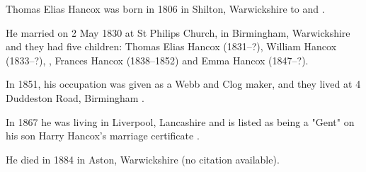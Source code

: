 
Thomas Elias Hancox was born in 1806 in Shilton, Warwickshire \cite{TEHancoxBirth} to  and .

He married  on 2  May 1830 at St Philips Church, in Birmingham, Warwickshire and they had five children: Thomas Elias Hancox (1831--?), William Hancox (1833--?), , Frances Hancox (1838--1852) and Emma Hancox (1847--?).

In 1851, his occupation was given as a Webb and Clog maker, and they lived at 4 Duddeston Road, Birmingham \cite{TEHancoxOccupation}.

In 1867 he was living in Liverpool, Lancashire and is listed as being a "Gent" on his son Harry Hancox's marriage certificate \cite{TEHancox1867}.

He died in 1884 in Aston, Warwickshire (no citation available).
